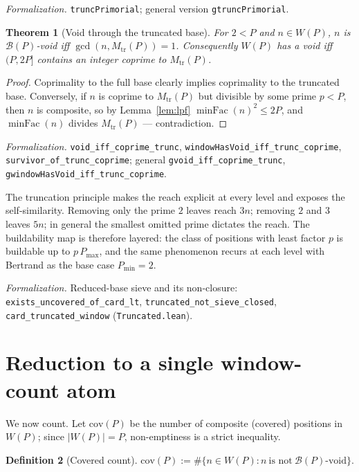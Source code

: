 \documentclass[11pt,a4paper]{amsart}
\theoremstyle{plain}
\newtheorem{theorem}{Theorem}[section]
\theoremstyle{definition}
\newtheorem{definition}[theorem]{Definition}
\theoremstyle{plain}
\theoremstyle{remark}
\newcommand{\lean}[1]{\textup{\texttt{#1}}}
\newcommand{\Formal}[1]{\par\smallskip\noindent\emph{Formalization.} #1\par\smallskip}
\begin{document}
\Formal{\lean{truncPrimorial}; general version \lean{gtruncPrimorial}.}

\begin{theorem}[Void through the truncated base]\label{thm:trunc}
For $2<P$ and $n\in W(P)$, $n$ is $\mathcal{B}(P)$-void iff $\gcd(n,M_{\mathrm{tr}}(P))=1$.
Consequently $W(P)$ has a void iff $(P,2P]$ contains an integer coprime to
$M_{\mathrm{tr}}(P)$.
\end{theorem}

\begin{proof}
Coprimality to the full base clearly implies coprimality to the truncated base. Conversely,
if $n$ is coprime to $M_{\mathrm{tr}}(P)$ but divisible by some prime $p<P$, then $n$ is
composite, so by Lemma~\ref{lem:lpf} $\operatorname{minFac}(n)^2\le 2P$, and
$\operatorname{minFac}(n)$ divides $M_{\mathrm{tr}}(P)$ --- contradiction.
\end{proof}

\Formal{\lean{void\_iff\_coprime\_trunc}, \lean{windowHasVoid\_iff\_trunc\_coprime},
\lean{survivor\_of\_trunc\_coprime}; general \lean{gvoid\_iff\_coprime\_trunc},
\lean{gwindowHasVoid\_iff\_trunc\_coprime}.}

The truncation principle makes the reach explicit at every level and exposes the
self-similarity. Removing only the prime $2$ leaves reach $3n$; removing $2$ and $3$ leaves
$5n$; in general the smallest omitted prime dictates the reach. The buildability map is
therefore layered: the class of positions with least factor $p$ is buildable up to
$p\,P_{\max}$, and the same phenomenon recurs at each level with Bertrand as the base case
$P_{\min}=2$.

\Formal{Reduced-base sieve and its non-closure:
\lean{exists\_uncovered\_of\_card\_lt}, \lean{truncated\_not\_sieve\_closed},
\lean{card\_truncated\_window} (\lean{Truncated.lean}).}

\section{Reduction to a single window-count atom}
\label{sec:atom}

We now count. Let $\mathrm{cov}(P)$ be the number of composite (covered) positions in
$W(P)$; since $|W(P)|=P$, non-emptiness is a strict inequality.

\begin{definition}[Covered count]
$\mathrm{cov}(P):=\#\{n\in W(P): n\ \text{is not}\ \mathcal{B}(P)\text{-void}\}.$
\end{definition}
\end{document}
